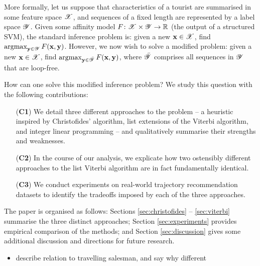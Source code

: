 More formally, let us suppose that characteristics of a tourist are summarised in some feature space $\mathscr{X}$,
and sequences of a fixed length are represented by a label space $\mathscr{Y}$.
Given some affinity model $F \colon \mathscr{X} \times \mathscr{Y} \to \mathbb{R}$ (\eg the output of a structured SVM), the standard inference problem is:
given a new $\mathbf{x} \in \mathscr{X}$, find $\operatorname*{argmax}_{\mathbf{y} \in \mathscr{Y}} F( \mathbf{x}, \mathbf{y} )$.
However, we now wish to solve a modified problem:
given a new $\mathbf{x} \in \mathscr{X}$, find $\operatorname*{argmax}_{\mathbf{y} \in \bar{\mathscr{Y}}} F( \mathbf{x}, \mathbf{y} )$,
where $\bar{\mathscr{Y}}$ comprises all sequences in $\mathscr{Y}$ that are loop-free.

How can one solve this modified inference problem?
We study this question with the following contributions:
\begin{enumerate}
	\item[(\textbf{C1})] We detail three different approaches to the problem -- a heuristic inspired by Christofides' algorithm, list extensions of the Viterbi algorithm, and integer linear programming -- and qualitatively summarise their strengths and weaknesses.
	\item[(\textbf{C2})] In the course of our analysis, we explicate how two ostensibly different approaches to the list Viterbi algorithm \citep{seshadri1994list,nilsson2001sequentially} are in fact fundamentally identical.
	\item[(\textbf{C3})] We conduct experiments on real-world trajectory recommendation datasets to identify the tradeoffs imposed by each of the three approaches.
\end{enumerate}

The paper is organised as follows:
Sections \ref{sec:christofides} -- \ref{sec:viterbi} summarise the three distinct approaches;
Section \ref{sec:experiments} provides empirical comparison of the methods;
and Section \ref{sec:discussion} gives some additional discussion and directions for future research.

{\color{red!75}
\begin{itemize}
	\item describe relation to travelling salesman, and say why different
\end{itemize}
}
